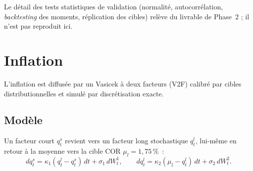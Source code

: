 \documentclass[11pt,a4paper]{article}
\begin{document}
Le détail des tests statistiques de validation (normalité, autocorrélation, \emph{backtesting} des moments, réplication des cibles) relève du livrable de Phase~2 ; il n'est pas reproduit ici.

\section{Inflation}
L'inflation est diffusée par un Vasicek à deux facteurs (V2F) calibré par cibles distributionnelles et simulé par discrétisation exacte.

\subsection{Modèle}
\begin{definitionbox}
Un facteur court $q_t^{s}$ revient vers un facteur long stochastique $q_t^{l}$, lui-même en retour à la moyenne vers la cible COR $\mu_l=1{,}75\,\%$~:
\[
dq_t^{s}=\kappa_1(q_t^{l}-q_t^{s})\,dt+\sigma_1\,dW_t^1,\qquad
dq_t^{l}=\kappa_2(\mu_l-q_t^{l})\,dt+\sigma_2\,dW_t^2 .
\]
\end{definitionbox}
\end{document}
